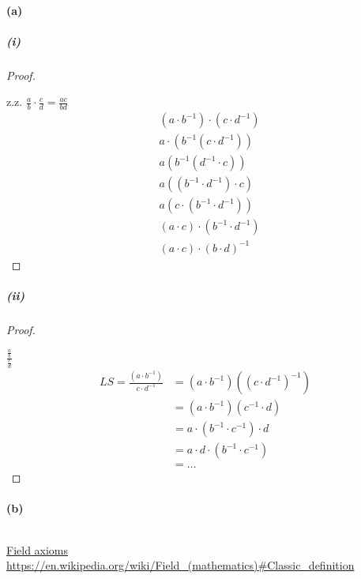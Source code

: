 \paragraph{(a)}

\subparagraph{(i)}
\begin{proof}
$ $\newline

z.z. $\frac{a}{b}\cdot\frac{c}{d}=\frac{ac}{bd}$\\
\begin{align*}
&(a\cdot b^{-1})\cdot(c\cdot d^{-1})\\
&a\cdot(b^{-1}(c\cdot d^{-1}))\\
&a(b^{-1}(d^{-1}\cdot c))\\
&a((b^{-1}\cdot d^{-1})\cdot c)\\
&a(c\cdot(b^{-1}\cdot d^{-1}))\\
&(a\cdot c)\cdot(b^{-1}\cdot d^{-1})\\
&(a\cdot c)\cdot(b\cdot d)^{-1}
\end{align*}
\end{proof}

\subparagraph{(ii)}
\begin{proof}
$ $\newline

$\frac{\frac{a}{b}}{\frac{c}{d}}$\\

\begin{align*}
LS=\frac{(a\cdot b^{-1})}{c\cdot d^{-1}}&=(a\cdot b^{-1})((c\cdot d^{-1})^{-1})\\
&=(a\cdot b^{-1})(c^{-1}\cdot d)\\
&=a\cdot(b^{-1}\cdot c^{-1})\cdot d\\
&=a\cdot d\cdot(b^{-1}\cdot c^{-1})\\
&=\ldots
\end{align*}
\end{proof}

\paragraph{(b)}
$ $\newline

\href{https://en.wikipedia.org/wiki/Field_(mathematics)#Classic_definition}{Field axioms}\\

\url{https://en.wikipedia.org/wiki/Field_(mathematics)#Classic_definition}

\newpage

